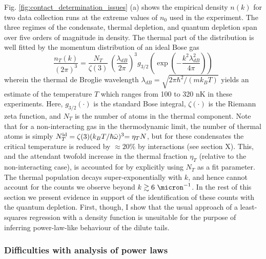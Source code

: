	Fig. \ref{fig:contact_determination_issues} (a) shows the empirical density $n(k)$ for two data collection runs at the extreme values of $n_0$ used in the experiment. The three regimes of the condensate, thermal depletion, and quantum depletion span over five orders of magnitude in density. The thermal part of the distribution is well fitted by the momentum distribution of an ideal Bose gas \cite{Dalfovo99}
	\begin{equation}
		\frac{n_T(k)}{{(2\pi)^3}} =\frac{N_T}{\zeta(3)} ~\left(\frac{\lambda_{dB}}{2\pi}\right)^3 g_{3/2}\left(\exp\left(-\frac{k^2 \lambda_{dB}^2}{4\pi}\right)\right)
		\label{eqn:th_fun}
	\end{equation}
	wherein the thermal de Broglie wavelength $\lambda_{dB} = \sqrt{2\pi\hbar^2/(m k_B T)}$ yields an estimate of the temperature $T$ which ranges from 100 to 320 nK in these experiments. Here, $g_{3/2}(\cdot)$ is the standard Bose integral, $\zeta(\cdot)$ is the Riemann zeta function, and $N_T$ is the number of atoms in the thermal component. 
	Note that for a non-interacting gas in the thermodynamic limit, the {number of thermal atoms} %
	is simply ${N_T^{\rm id}} = \zeta(3)(k_B T / \hbar\bar{\omega})^3{=\eta_T N}$, but for these condensates the critical temperature is reduced by $\approx20\%$ by interactions (see section X).
	This, and the attendant twofold increase in the thermal fraction {$\eta_T$}  (relative to the non-interacting case), is accounted for by explicitly using $N_T$ as a fit parameter.
	The thermal population decays super-exponentially with $k$, and hence cannot account for the counts we observe beyond $k\gtrsim 6~\micron^{-1}$. 
	In the rest of this section we present evidence in support of the identification of these counts with the quantum depletion. 
	First, though, I show that the usual approach of a least-squares regression with a density function is unsuitable for the purpose of inferring power-law-like behaviour of the dilute tails.

\subsubsection{Difficulties with analysis of power laws}	
\label{sec:pow_issues}

